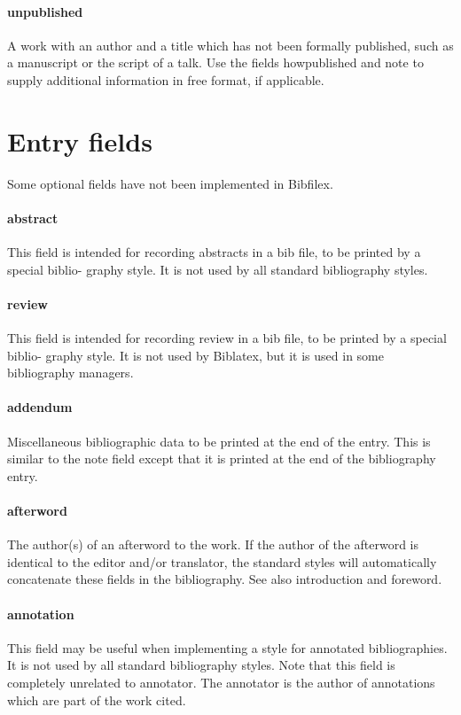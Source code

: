 \documentclass[a4paper,12pt]{report}
\begin{document}
\paragraph{unpublished}
A work with an author and a title which has not been formally published, such as a
manuscript or the script of a talk. Use the fields howpublished and note to supply additional
information in free format, if applicable.

\section{Entry fields}

\noindent Some optional fields have not been implemented in Bibfilex.

\paragraph{abstract}
This field is intended for recording abstracts in a bib file, to be printed by a special biblio-
graphy style. It is not used by all standard bibliography styles.

\paragraph{review}
This field is intended for recording review in a bib file, to be printed by a special biblio-
graphy style. It is not used by Biblatex, but it is used in some bibliography managers. 

\paragraph{addendum}
Miscellaneous bibliographic data to be printed at the end of the entry. This is similar to the
note field except that it is printed at the end of the bibliography entry.

\paragraph{afterword}
The author(s) of an afterword to the work. If the author of the afterword is identical to the
editor and/or translator, the standard styles will automatically concatenate these fields
in the bibliography. See also introduction and foreword.

\paragraph{annotation}
This field may be useful when implementing a style for annotated bibliographies. It is not
used by all standard bibliography styles. Note that this field is completely unrelated to
annotator. The annotator is the author of annotations which are part of the work cited.
\end{document}
